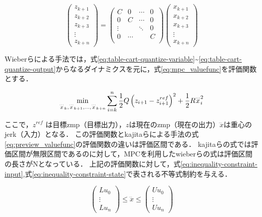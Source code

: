 \begin{equation}
  \begin{pmatrix}
    z_{k+1} \\z_{k+2}\\z_{k+3}\\
    \vdots  \\ z_{k+n}
  \end{pmatrix}
  =
  \begin{pmatrix}
    C      & 0 & \cdots & 0 \\
    0      & C & \cdots & 0 \\
    \vdots &   &    \ddots  & 0 \\
    0 & \cdots & & C\\
  \end{pmatrix}
  \begin{pmatrix}
    x_{k+1} \\x_{k+2}\\x_{k+3}\\
    \vdots  \\ x_{k+n}
  \end{pmatrix}
  \label{eq:mpc-preview-output}
\end{equation}

Wieberらによる手法\cite{WIEBER}では，式\eqref{eq:table-cart-quantize-variable}\textasciitilde\eqref{eq:table-cart-quantize-output}からなるダイナミクスを元に，式\eqref{eq:mpc_valuefunc}を評価関数とする．

\begin{equation}
  \min_{{\buildrel\ldots\over{x}}_{k},{\buildrel\ldots\over{x}}_{k+1},\ldots,{\buildrel\ldots\over{x}}_{k+n}}\sum_{i=k}^{n}{1\over 2}Q\left(z_{i+1}-z_{i+1}^{ref}\right)^{2}+{1\over 2}R{\buildrel\ldots\over{x}}_{i}^{2}
  \label{eq:mpc_valuefunc}
\end{equation}

ここで，$z^{ref}$ は目標zmp（目標出力），$z$は現在のzmp（現在の出力）$\dddot{x}$は重心のjerk（入力）となる．
この評価関数とkajitaらによる手法の式\eqref{eq:preview_valuefunc}の評価関数の違いは評価区間である．
kajitaらの式では評価区間が無限区間であるのに対して，MPCを利用したwieberらの式は評価区間の長さがNとなっている．
上記の評価関数に対して，式\eqref{eq:inequality-constraint-input},式\eqref{eq:inequality-constraint-state}で表される不等式制約を与える．

\begin{equation}
  \begin{pmatrix}
    Lu_{0} \\ \vdots \\ Lu_{n}
  \end{pmatrix}
  \leq \dddot{x} \leq
  \begin{pmatrix}
    Uu_{0} \\ \vdots \\ Uu_{n}
  \end{pmatrix}
  \label{eq:inequality-constraint-input}
\end{equation}

